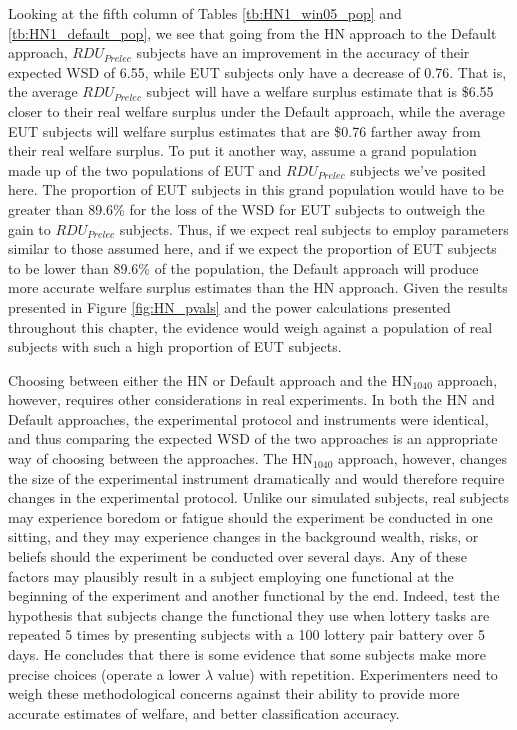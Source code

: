 \documentclass[../main.tex]{subfiles}
\begin{document}
Looking at the fifth column of Tables \ref{tb:HN1_win05_pop} and \ref{tb:HN1_default_pop}, we see that going from the HN approach to the Default approach, $\mathit{RDU_{Prelec}}$ subjects have an improvement in the accuracy of their expected WSD of 6.55, while EUT subjects only have a decrease of 0.76.
That is, the average $\mathit{RDU_{Prelec}}$ subject will have a welfare surplus estimate that is \$6.55 closer to their real welfare surplus under the Default approach, while the average EUT subjects will welfare surplus estimates that are \$0.76 farther away from their real welfare surplus.
To put it another way, assume a grand population made up of the two populations of EUT and $\mathit{RDU_{Prelec}}$ subjects we've posited here.
The proportion of EUT subjects in this grand population would have to be greater than 89.6\% for the loss of the WSD for EUT subjects to outweigh the gain to $\mathit{RDU_{Prelec}}$ subjects.{\footnotemark}
Thus, if we expect real subjects to employ parameters similar to those assumed here, and if we expect the proportion of EUT subjects to be lower than  89.6\% of the population, the Default approach will produce more accurate welfare surplus estimates than the HN approach.
Given the results presented in Figure \ref{fig:HN_pvals} and the power calculations presented throughout this chapter, the evidence would weigh against a population of real subjects with such a high proportion of EUT subjects.

\addtocounter{footnote}{-1}

Choosing between either the HN or Default approach and the $\text{HN}_{1040}$ approach, however, requires other considerations in real experiments.
In both the HN and Default approaches, the experimental protocol and instruments were identical, and thus comparing the expected WSD of the two approaches is an appropriate way of choosing between the approaches.
The $\text{HN}_{1040}$ approach, however, changes the size of the experimental instrument dramatically and would therefore require changes in the experimental protocol.
Unlike our simulated subjects, real subjects may experience boredom or fatigue should the experiment be conducted in one sitting, and they may experience changes in the background wealth, risks, or beliefs should the experiment be conducted over several days.
Any of these factors may plausibly result in a subject employing one functional at the beginning of the experiment and another functional by the end.
Indeed, \textcite{Hey2001} test the hypothesis that subjects change the functional they use when lottery tasks are repeated 5 times by presenting subjects with a 100 lottery pair battery over 5 days.
He concludes that there is some evidence that some subjects make more precise choices (operate a lower $\lambda$ value) with repetition.
Experimenters need to weigh these methodological concerns against their ability to provide more accurate estimates of welfare, and better classification accuracy.
\end{document}
